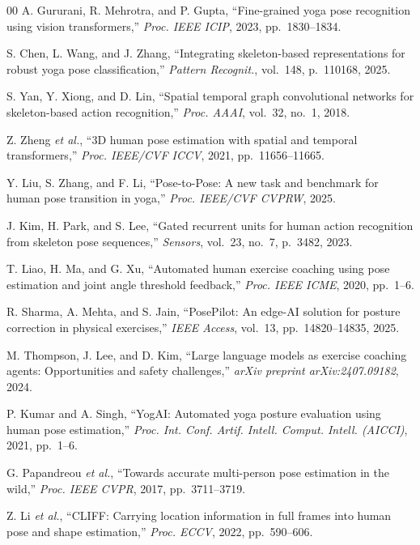 \documentclass[conference]{IEEEtran}
\begin{document}
\begin{thebibliography}{00}
A. Gururani, R. Mehrotra, and P. Gupta, ``Fine-grained yoga pose recognition using vision
transformers,'' \textit{Proc. IEEE ICIP}, 2023, pp.~1830--1834.

S. Chen, L. Wang, and J. Zhang, ``Integrating skeleton-based representations for robust
yoga pose classification,'' \textit{Pattern Recognit.}, vol.~148, p.~110168, 2025.

S. Yan, Y. Xiong, and D. Lin, ``Spatial temporal graph convolutional networks for
skeleton-based action recognition,'' \textit{Proc. AAAI}, vol.~32, no.~1, 2018.

Z. Zheng \textit{et al.}, ``3D human pose estimation with spatial and temporal
transformers,'' \textit{Proc. IEEE/CVF ICCV}, 2021, pp.~11656--11665.

Y. Liu, S. Zhang, and F. Li, ``Pose-to-Pose: A new task and benchmark for human pose
transition in yoga,'' \textit{Proc. IEEE/CVF CVPRW}, 2025.

J. Kim, H. Park, and S. Lee, ``Gated recurrent units for human action recognition from
skeleton pose sequences,'' \textit{Sensors}, vol.~23, no.~7, p.~3482, 2023.

T. Liao, H. Ma, and G. Xu, ``Automated human exercise coaching using pose estimation and
joint angle threshold feedback,'' \textit{Proc. IEEE ICME}, 2020, pp.~1--6.

R. Sharma, A. Mehta, and S. Jain, ``PosePilot: An edge-AI solution for posture correction
in physical exercises,'' \textit{IEEE Access}, vol.~13, pp.~14820--14835, 2025.

M. Thompson, J. Lee, and D. Kim, ``Large language models as exercise coaching agents:
Opportunities and safety challenges,'' \textit{arXiv preprint arXiv:2407.09182}, 2024.

P. Kumar and A. Singh, ``YogAI: Automated yoga posture evaluation using human pose
estimation,'' \textit{Proc. Int. Conf. Artif. Intell. Comput. Intell. (AICCI)}, 2021,
pp.~1--6.

G. Papandreou \textit{et al.}, ``Towards accurate multi-person pose estimation in the
wild,'' \textit{Proc. IEEE CVPR}, 2017, pp.~3711--3719.

Z. Li \textit{et al.}, ``CLIFF: Carrying location information in full frames into human
pose and shape estimation,'' \textit{Proc. ECCV}, 2022, pp.~590--606.

\end{thebibliography}
\end{document}
